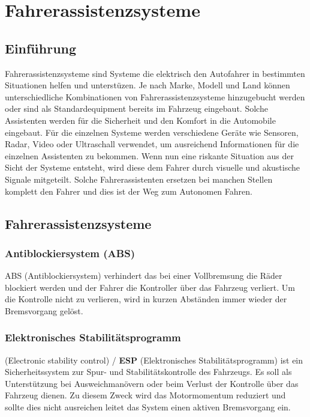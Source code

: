 \section{Fahrerassistenzsysteme}
    \subsection{Einführung}
    Fahrerassistenzsysteme sind Systeme die elektrisch den Autofahrer in bestimmten
    Situationen helfen und unterstüzen. Je nach Marke, Modell und Land können
    unterschiedliche Kombinationen von Fahrerassistenzsysteme hinzugebucht werden
    oder sind als Standardequipment bereits im Fahrzeug eingebaut. Solche Assistenten
    werden für die Sicherheit und den Komfort in die Automobile eingebaut. Für die
    einzelnen Systeme werden verschiedene Geräte wie Sensoren, Radar, Video oder
    Ultraschall verwendet, um ausreichend Informationen für die einzelnen Assistenten
    zu bekommen. Wenn nun eine riskante Situation aus der Sicht der Systeme entsteht,
    wird diese dem Fahrer durch visuelle und akustische Signale mitgeteilt. Solche
    Fahrerassistenten ersetzen bei manchen Stellen komplett den Fahrer und dies ist
    der Weg zum Autonomen Fahren.
    ~\cite{assistenzsysteme.PB1} ~\cite{assistenzsysteme.PB2} ~\cite{assistenzsysteme.PB3}
    ~\cite{assistenzsysteme.PB4}
    \subsection{Fahrerassistenzsysteme}

        \subsubsection{Antiblockiersystem (ABS)}
        ABS (Antiblockiersystem) verhindert das bei einer Vollbremsung die Räder
        blockiert werden und der Fahrer die Kontroller über das Fahrzeug verliert.
        Um die Kontrolle nicht zu verlieren, wird in kurzen Abständen immer wieder
        der Bremsvorgang gelöst.
        ~\cite{assistenzsysteme.PB2} ~\cite{antiblockiersys.PB1}

        \subsubsection{Elektronisches Stabilitätsprogramm}
        (Electronic stability control) / \textbf{ESP} (Elektronisches Stabilitätsprogramm)
        ist ein Sicherheitssystem zur Spur- und Stabilitätskontrolle des Fahrzeugs.
        Es soll als Unterstützung bei Ausweichmanövern oder beim Verlust der Kontrolle über das Fahrzeug dienen. 
        Zu diesem Zweck wird das Motormomentum reduziert und sollte dies nicht ausreichen leitet das System einen aktiven
        Bremsvorgang ein.
        ~\cite{assistenzsysteme.PB2} ~\cite{ESP.PB1}
        
